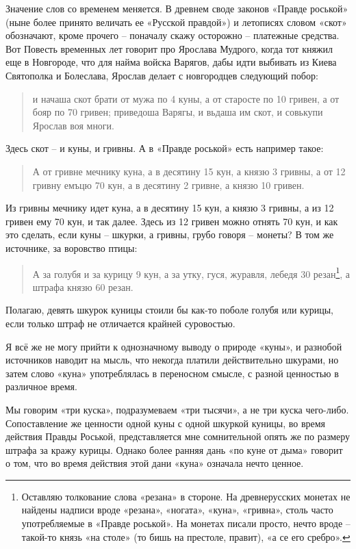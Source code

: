 Значение слов со временем меняется. В древнем своде законов «Правде роськой» (ныне более принято величать ее «Русской правдой») и летописях словом «скот» обозначают, кроме прочего – поначалу скажу осторожно – платежные средства. Вот Повесть временных лет говорит про Ярослава Мудрого, когда тот княжил еще в Новгороде, что для найма войска Варягов, дабы идти выбивать из Киева Святополка и Болеслава, Ярослав делает с новгородцев следующий побор: 

\begin{quotation}
и начаша скот брати от мужа по 4 куны, а от старосте по 10 гривен, а от бояр по 70 гривен; приведоша Варягы, и вьдаша им скот, и совькупи Ярослав воя многи.
\end{quotation}

Здесь скот – и куны, и гривны. А в «Правде роськой» есть например такое:

\begin{quotation}
А от гривне мечнику куна, а в десятину 15 кун, а князю 3 гривны, а от 12 гривну емъцю 70 кун, а в десятину 2 гривне, а князю 10 гривен.
\end{quotation}

Из гривны мечнику идет куна, а в десятину 15 кун, а князю 3 гривны, а из 12 гривен ему 70 кун, и так далее. Здесь из 12 гривен можно отнять 70 кун, и как это сделать, если куны – шкурки, а гривны, грубо говоря – монеты? В том же источнике, за воровство птицы:

\begin{quotation}
А за голубя и за курицу 9 кун, а за утку, гуся, журавля, лебедя 30 резан\footnote{Оставляю толкование слова «резана» в стороне. На древнерусских монетах не найдены надписи вроде «резана», «ногата», «куна», «гривна», столь часто употребляемые в «Правде роськой». На монетах писали просто, нечто вроде – такой-то князь «на столе» (то бишь на престоле, правит), «а се его сребро».}, а штрафа князю 60 резан.
\end{quotation}

Полагаю, девять шкурок куницы стоили бы как-то поболе голубя или курицы, если только штраф не отличается крайней суровостью. 

Я всё же не могу прийти к однозначному выводу о природе «куны», и разнобой источников наводит на мысль, что некогда платили действительно шкурами, но затем слово «куна» употреблялась в переносном смысле, с разной ценностью в различное время. 

Мы говорим «три куска», подразумеваем «три тысячи», а не три куска чего-либо. Сопоставление же ценности одной куны с одной шкуркой куницы, во время действия Правды Роськой, представляется мне сомнительной опять же по размеру штрафа за кражу курицы. Однако более ранняя дань «по куне от дыма» говорит о том, что во время действия этой дани «куна» означала нечто ценное. 

